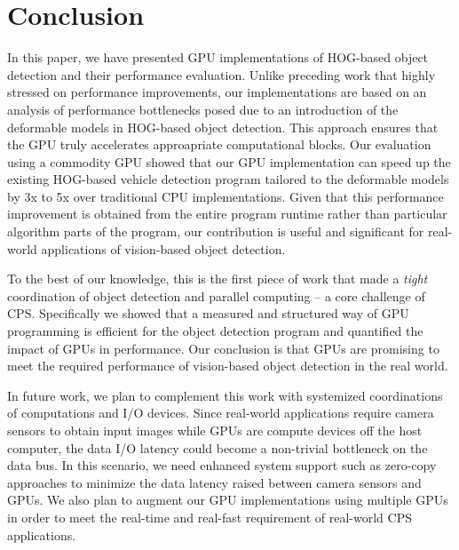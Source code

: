 \section{Conclusion}
\label{sec:conclusion}

In this paper, we have presented GPU implementations of HOG-based object
detection and their performance evaluation.
Unlike preceding work that highly stressed on performance improvements,
our implementations are based on an analysis of performance bottlenecks
posed due to an introduction of the deformable models in HOG-based
object detection.
This approach ensures that the GPU truly accelerates approapriate
computational blocks.
Our evaluation using a commodity GPU showed that our GPU implementation
can speed up the existing HOG-based vehicle detection program tailored
to the deformable models by 3x to 5x over traditional CPU
implementations.
Given that this performance improvement is obtained from the entire
program runtime rather than particular algorithm parts of the program,
our contribution is useful and significant for real-world applications
of vision-based object detection. 

To the best of our knowledge, this is the first piece of work that made
a \textit{tight} coordination of object detection and parallel computing
-- a core challenge of CPS.
Specifically we showed that a measured and structured way of GPU
programming is efficient for the object detection program and quantified
the impact of GPUs in performance.
Our conclusion is that GPUs are promising to meet the required
performance of vision-based object detection in the real world.

In future work, we plan to complement this work with systemized
coordinations of computations and I/O devices.
Since real-world applications require camera sensors to obtain input
images while GPUs are compute devices off the host computer, the data
I/O latency could become a non-trivial bottleneck on the data bus.
In this scenario, we need enhanced system support such as zero-copy
approaches \cite{Kato13} to minimize the data latency raised between
camera sensors and GPUs.
We also plan to augment our GPU implementations using multiple GPUs in
order to meet the real-time and real-fast requirement of real-world CPS
applications.
